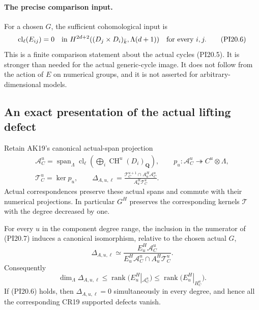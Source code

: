 \paragraph{The precise comparison input.}
For a chosen $G$, the sufficient cohomological input is
\[
 \operatorname{cl}_{\ell}(E_{ij})=0
 \quad\hbox{in }
 H^{2d+2}((D_j\times D_i)_{\bar k},\Lambda(d+1))
 \quad\hbox{for every }i,j.
 \tag{PI20.6}\label{r20pi:errorzero}
\]
This is a finite comparison statement about the actual cycles
(PI20.5).  It is stronger than needed for the actual generic-cycle
image.  It does not follow from the action of $E$ on numerical
groups, and it is not asserted for arbitrary-dimensional models.

\subsection{An exact presentation of the actual lifting defect}

Retain AK19's canonical actual-span projection
\[
 \begin{gathered}
 \mathscr A_C^u=
 \operatorname{span}_{\Lambda}\operatorname{cl}_{\ell}
      \left(\bigoplus_i\operatorname{CH}^u(D_i)_{\mathbf Q}\right),
 \qquad p_u:\mathscr A_C^u\twoheadrightarrow C^u\otimes\Lambda,\\
 \mathscr T_C^u=\ker p_u,\qquad
 \Delta_{A,u,\ell}
 =\frac{\mathscr T_C^{u+1}\cap A^H_u\mathscr A_C^u}
              {A^H_u\mathscr T_C^u}.
 \end{gathered}
 \tag{PI20.7}\label{r20pi:delta}
\]
Actual correspondences preserve these actual spans and commute with
their numerical projections.  In particular $G^H$ preserves the
corresponding kernels $\mathscr T$ with the degree decreased by one.

\begin{theorem}
\label{r20pi:exacterror}
For every $u$ in the component degree range, the inclusion in the
numerator of (PI20.7) induces a canonical isomorphism, relative to
the chosen actual $G$,
\[
 \boxed{\quad
 \Delta_{A,u,\ell}\simeq
 \frac{E^H_u\mathscr A_C^u}
 {E^H_u\mathscr A_C^u\cap A^H_u\mathscr T_C^u}.
 \quad}
 \tag{PI20.8}\label{r20pi:errorpresentation}
\]
Consequently
\[
 \dim_\Lambda\Delta_{A,u,\ell}
 \le\operatorname{rank}\bigl(E^H_u|_{\mathscr A_C^u}\bigr)
 \le\operatorname{rank}\bigl(E^H_u|_{H_C^u}\bigr).
 \tag{PI20.9}\label{r20pi:errorrank}
\]
If (PI20.6) holds, then $\Delta_{A,u,\ell}=0$ simultaneously
in every degree, and hence all the corresponding CR19 supported
defects vanish.
\end{theorem}

